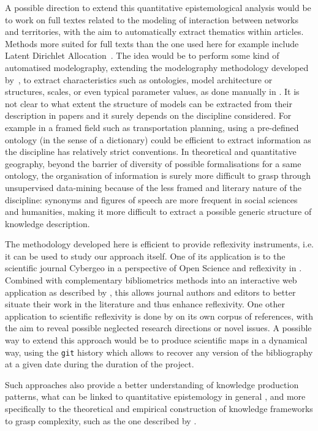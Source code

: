 \documentclass[10pt]{article}
\begin{document}
A possible direction to extend this quantitative epistemological analysis would be to work on full textes related to the modeling of interaction between networks and territories, with the aim to automatically extract thematics within articles. Methods more suited for full texts than the one used here for example include Latent Dirichlet Allocation~\cite{blei2003latent}. The idea would be to perform some kind of automatised modelography, extending the modelography methodology developed by~\cite{schmitt2013modelographie}, to extract characteristics such as ontologies, model architecture or structures, scales, or even typical parameter values, as done manually in \cite{raimbault2020systematic}. It is not clear to what extent the structure of models can be extracted from their description in papers and it surely depends on the discipline considered. For example in a framed field such as transportation planning, using a pre-defined ontology (in the sense of a dictionary) could be efficient to extract information as the discipline has relatively strict conventions. In theoretical and quantitative geography, beyond the barrier of diversity of possible formalisations for a same ontology, the organisation of information is surely more difficult to grasp through unsupervised data-mining because of the less framed and literary nature of the discipline: synonyms and figures of speech are more frequent in social sciences and humanities, making it more difficult to extract a possible generic structure of knowledge description.

The methodology developed here is efficient to provide reflexivity instruments, i.e. it can be used to study our approach itself. One of its application is to the scientific journal Cybergeo in a perspective of Open Science and reflexivity in \cite{raimbault2019exploration}. Combined with complementary bibliometrics methods into an interactive web application as described by \cite{raimbault2021empowering}, this allows journal authors and editors to better situate their work in the literature and thus enhance reflexivity. One other application to scientific reflexivity is done by \cite{raimbault2018caracterisation} on its own corpus of references, with the aim to reveal possible neglected research directions or novel issues. A possible way to extend this approach would be to produce scientific maps in a dynamical way, using the \texttt{git} history which allows to recover any version of the bibliography at a given date during the duration of the project.

Such approaches also provide a better understanding of knowledge production patterns, what can be linked to quantitative epistemology in general \cite{chavalarias2013phylomemetic}, and more specifically to the theoretical and empirical construction of knowledge frameworks to grasp complexity, such as the one described by \cite{raimbault2017applied}.
\end{document}
